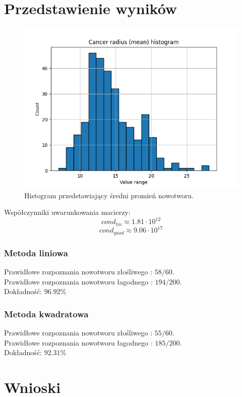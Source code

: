 \documentclass[11pt]{scrartcl}
\begin{document}
    \section{Przedstawienie wyników}
    \begin{figure}[H]
        \centering
        \includegraphics[width=0.8\linewidth]{cancer_radius_hist.png}
        \caption{Histogram przedstawiający średni promień nowotworu.}
    \end{figure}

    Współczynniki uwarunkowania macierzy:
    \[
        cond_{lin} \approx 1.81 \cdot 10^{12}
    \]
    \[
        cond_{quad} \approx 9.06 \cdot 10^{17}
    \]

    \subsubsection*{Metoda liniowa}
    Prawidłowe rozpoznania nowotworu złośliwego : $58/60$. \\
    Prawidłowe rozpoznania nowotworu łagodnego : $194/200$. \\
    Dokładność: $96.92\%$
    \subsubsection*{Metoda kwadratowa}
    Prawidłowe rozpoznania nowotworu złośliwego : $55/60$. \\
    Prawidłowe rozpoznania nowotworu łagodnego : $185/200$. \\
    Dokładność: $92.31\%$

    \section{Wnioski}
    
\end{document}
